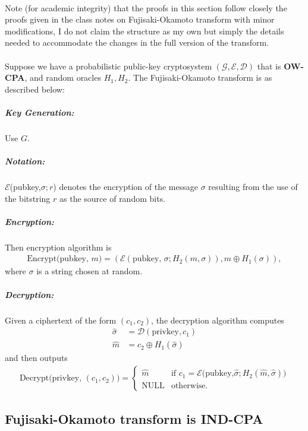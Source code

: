 \documentclass[letterpaper,12pt,oneside,onecolumn]{report}
\begin{document}
\paragraph{}
Note (for academic integrity) that the proofs in this section follow closely the proofs given in the class notes on Fujisaki-Okamoto transform with minor modifications, I do not claim the structure as my own but simply the details needed to accommodate the changes in the full version of the transform.
\paragraph{}
Suppose we have a probabilistic public-key cryptosystem $(\mathcal{G}, \mathcal{E}, \mathcal{D})$ that is \textbf{OW-CPA}, and random oracles $H_1, H_2$. The Fujisaki-Okamoto transform is as described below:
\subparagraph{Key Generation:}
Use $G$.
\subparagraph{Notation:}
$\mathcal{E}$(pubkey,$\sigma;r$) denotes the encryption of the message $\sigma$ resulting from the use of the bitstring $r$ as the source of random bits.
\subparagraph{Encryption:}
Then encryption algorithm is
\begin{align*}
\text{Encrypt(pubkey, }m) = (\mathcal{E}(\text{pubkey, }\sigma;H_2(m,\sigma)), m \oplus H_1(\sigma)),
\end{align*}
 where $\sigma$ is a string chosen at random.
 \subparagraph{Decryption:}
 Given a ciphertext of the form $(c_1,c_2)$, the decryption algorithm computes
 \begin{align*}
 \hat{\sigma} &= \mathcal{D}(\text{privkey},c_1) \\
 \hat{m} &= c_2 \oplus H_1(\hat{\sigma})
 \end{align*}
 and then outputs
 \begin{align*}
 \text{Decrypt(privkey, }(c_1,c_2)) = \begin{cases}
 \hat{m} &\text{if $c_1 = \mathcal{E}$(pubkey,$\hat{\sigma};H_2(\hat{m},\hat{\sigma}))$}\\
 \text{NULL} &\text{otherwise.}
 \end{cases}
 \end{align*}
 \subsection*{Fujisaki-Okamoto transform is IND-CPA}
\end{document}
